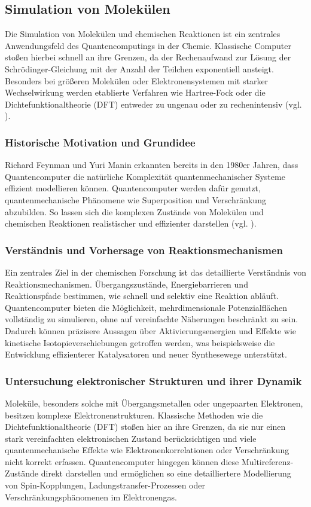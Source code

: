 \subsection{Simulation von Molekülen}
{Die Simulation von Molekülen und chemischen Reaktionen ist ein zentrales Anwendungsfeld des Quantencomputings in der Chemie. Klassische Computer stoßen hierbei schnell an ihre Grenzen, da der Rechenaufwand zur Lösung der Schrödinger-Gleichung mit der Anzahl der Teilchen exponentiell ansteigt. Besonders bei größeren Molekülen oder Elektronensystemen mit starker Wechselwirkung werden etablierte Verfahren wie Hartree-Fock oder die Dichtefunktionaltheorie (DFT) entweder zu ungenau oder zu rechenintensiv (vgl. \cite{bauer_quantum_2020}).

\subsubsection{Historische Motivation und Grundidee}
Richard Feynman und Yuri Manin erkannten bereits in den 1980er Jahren, dass Quantencomputer die natürliche Komplexität quantenmechanischer Systeme effizient modellieren können. Quantencomputer werden dafür genutzt, quantenmechanische Phänomene wie Superposition und Verschränkung abzubilden. So lassen sich die komplexen Zustände von Molekülen und chemischen Reaktionen realistischer und effizienter darstellen (vgl. \cite{feynmanSimulatingPhysicsComputers1982}). 


\subsubsection{Verständnis und Vorhersage von Reaktionsmechanismen}

Ein zentrales Ziel in der chemischen Forschung ist das detaillierte Verständnis von Reaktionsmechanismen. Übergangszustände, Energiebarrieren und Reaktionspfade bestimmen, wie schnell und selektiv eine Reaktion abläuft. Quantencomputer bieten die Möglichkeit, mehrdimensionale Potenzialflächen vollständig zu simulieren, ohne auf vereinfachte Näherungen beschränkt zu sein. Dadurch können präzisere Aussagen über Aktivierungsenergien und Effekte wie kinetische Isotopieverschiebungen getroffen werden, was beispielsweise die Entwicklung effizienterer Katalysatoren und neuer Synthesewege unterstützt.

\subsubsection{Untersuchung elektronischer Strukturen und ihrer Dynamik}
Moleküle, besonders solche mit Übergangsmetallen oder ungepaarten Elektronen, besitzen komplexe Elektronenstrukturen. Klassische Methoden wie die Dichtefunktionaltheorie (DFT) stoßen hier an ihre Grenzen, da sie nur einen stark vereinfachten elektronischen Zustand berücksichtigen und viele quantenmechanische Effekte wie Elektronenkorrelationen oder Verschränkung nicht korrekt erfassen. Quantencomputer hingegen können diese Multireferenz-Zustände direkt darstellen und ermöglichen so eine detailliertere Modellierung von Spin-Kopplungen, Ladungstransfer-Prozessen oder Verschränkungsphänomenen im Elektronengas.

}
